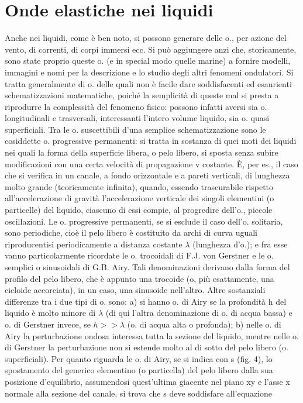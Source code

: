 \documentclass[a4paper]{article}
\begin{document}
\section{Onde elastiche nei liquidi}
Anche nei liquidi, come è ben noto, si possono generare delle o., per azione del vento, di correnti, di corpi immersi ecc. Si può aggiungere anzi che, storicamente, sono state proprio queste o. (e in special modo quelle marine) a fornire modelli, immagini e nomi per la descrizione e lo studio degli altri fenomeni ondulatori. Si tratta generalmente di o. delle quali non è facile dare soddisfacenti ed esaurienti schematizzazioni matematiche, poiché la semplicità di queste mal si presta a riprodurre la complessità del fenomeno fisico: possono infatti aversi sia o. longitudinali e trasversali, interessanti l’intero volume liquido, sia o. quasi superficiali. Tra le o. suscettibili d’una semplice schematizzazione sono le cosiddette o. progressive permanenti: si tratta in sostanza di quei moti dei liquidi nei quali la forma della superficie libera, o pelo libero, si sposta senza subire modificazioni con una certa velocità di propagazione v costante. È, per es., il caso che si verifica in un canale, a fondo orizzontale e a pareti verticali, di lunghezza molto grande (teoricamente infinita), quando, essendo trascurabile rispetto all’accelerazione di gravità l’accelerazione verticale dei singoli elementini (o particelle) del liquido, ciascuno di essi compie, al progredire dell’o., piccole oscillazioni. Le o. progressive permanenti, se si esclude il caso dell’o. solitaria, sono periodiche, cioè il pelo libero è costituito da archi di curva uguali riproducentisi periodicamente a distanza costante $\lambda$ (lunghezza d’o.); e fra esse vanno particolarmente ricordate le o. trocoidali di F.J. von Gerstner e le o. semplici o sinusoidali di G.B. Airy. Tali denominazioni derivano dalla forma del profilo del pelo libero, che è appunto una trocoide (o, più esattamente, una cicloide accorciata), in un caso, una sinusoide nell’altro. Altre sostanziali differenze tra i due tipi di o. sono: a) si hanno o. di Airy se la profondità h del liquido è molto minore di $\lambda$ (di qui l’altra denominazione di o. di acqua bassa) e o. di Gerstner invece, se $h>>\lambda$ (o. di acqua alta o profonda); b) nelle o. di Airy la perturbazione ondosa interessa tutta la sezione del liquido, mentre nelle o. di Gerstner la perturbazione non si estende molto al di sotto del pelo libero (o. superficiali). Per quanto riguarda le o. di Airy, se si indica con s (fig. 4), lo spostamento del generico elementino (o particella) del pelo libero dalla sua posizione d’equilibrio, assumendosi quest’ultima giacente nel piano xy e l’asse x normale alla sezione del canale, si trova che s deve soddisfare all’equazione
\end{document}
